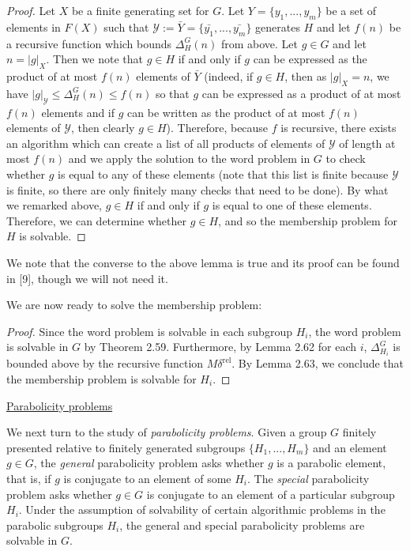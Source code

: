 \documentclass[12pt]{article}
\newcommand{\vs}{\vskip10pt}
\begin{document}
	\begin{proof}
		
		Let $X$ be a finite generating set for $G$. Let $Y = \{y_1,...,y_m\}$ be a set of elements in $F(X)$ such that $\mathcal{Y} := \bar{Y} = \{\bar{y_1},...,\bar{y_m}\}$ generates $H$ and let $f(n)$ be a recursive function which bounds $\Delta_H^G(n)$ from above. Let $g \in G$ and let $n = \vert g \vert_X$. Then we note that $g \in H$ if and only if $g$ can be expressed as the product of at most $f(n)$ elements of $\bar{Y}$ (indeed, if $g \in H$, then as $\vert g \vert_X = n$, we have $\vert g \vert_{\mathcal{Y}} \leq \Delta_H^G(n) \leq f(n)$ so that $g$ can be expressed as a product of at most $f(n)$ elements and if $g$ can be written as the product of at most $f(n)$ elements of $\mathcal{Y}$, then clearly $g \in H$). Therefore, because $f$ is recursive, there exists an algorithm which can create a list of all products of elements of $\mathcal{Y}$ of length at most $f(n)$ and we apply the solution to the word problem in $G$ to check whether $g$ is equal to any of these elements (note that this list is finite because $\mathcal{Y}$ is finite, so there are only finitely many checks that need to be done). By what we remarked above, $g \in H$ if and only if $g$ is equal to one of these elements. Therefore, we can determine whether $g \in H$, and so the membership problem for $H$ is solvable.
		
	\end{proof}

	We note that the converse to the above lemma is true and its proof can be found in [9], though we will not need it. 
	
	\vs
	
	We are now ready to solve the membership problem: 
	
	\vs 
	
	\begin{proof}
		
		Since the word problem is solvable in each subgroup $H_i$, the word problem is solvable in $G$ by Theorem 2.59. Furthermore, by Lemma 2.62 for each $i$, $\Delta_{H_i}^G$ is bounded above by the recursive function $M \delta^{\text{rel}}$. By Lemma 2.63, we conclude that the membership problem is solvable for $H_i$.
		
	\end{proof}

	\underline{Parabolicity problems}
	
	\vs 
	
	We next turn to the study of \textit{parabolicity problems}. Given a group $G$ finitely presented relative to finitely generated subgroups $\{H_1,...,H_m\}$ and an element $g \in G$, the \textit{general} parabolicity problem asks whether $g$ is a parabolic element, that is, if $g$ is conjugate to an element of some $H_i$. The \textit{special} parabolicity problem asks whether $g \in G$ is conjugate to an element of a particular subgroup $H_i$. Under the assumption of solvability of certain algorithmic problems in the parabolic subgroups $H_i$, the general and special parabolicity problems are solvable in $G$. 
	
\end{document}
